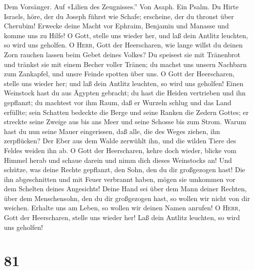  Dem Vorsänger. Auf «Lilien des Zeugnisses.'' Von Asaph.
Ein Psalm. Du Hirte Israels, höre, der du Joseph führst wie Schafe;
erscheine, der du thronst über Cherubim!  Erwecke deine
Macht vor Ephraim, Benjamin und Manasse und komme uns zu Hilfe!
 O Gott, stelle uns wieder her, und laß dein Antlitz
leuchten, so wird uns geholfen.  O \textsc{Herr}, Gott der
Heerscharen, wie lange willst du deinen Zorn rauchen lassen beim Gebet
deines Volkes?  Du speisest sie mit Tränenbrot und tränkst
sie mit einem Becher voller Tränen;  du machst uns unsern
Nachbarn zum Zankapfel, und unsre Feinde spotten über uns.
 O Gott der Heerscharen, stelle uns wieder her; und laß
dein Antlitz leuchten, so wird uns geholfen!  Einen
Weinstock hast du aus Ägypten gebracht; du hast die Heiden vertrieben
und ihn gepflanzt;  du machtest vor ihm Raum, daß er
Wurzeln schlug und das Land erfüllte;  sein Schatten
bedeckte die Berge und seine Ranken die Zedern Gottes; 
er streckte seine Zweige aus bis ans Meer und seine Schosse bis zum
Strom.  Warum hast du nun seine Mauer eingerissen, daß
alle, die des Weges ziehen, ihn zerpflücken?  Der Eber
aus dem Walde zerwühlt ihn, und die wilden Tiere des Feldes weiden ihn
ab.  O Gott der Heerscharen, kehre doch wieder, blicke
vom Himmel herab und schaue darein und nimm dich dieses Weinstocks an!
 Und schütze, was deine Rechte gepflanzt, den Sohn, den
du dir großgezogen hast!  Die ihn abgeschnitten und mit
Feuer verbrannt haben, mögen sie umkommen vor dem Schelten deines
Angesichts!  Deine Hand sei über dem Mann deiner Rechten,
über dem Menschensohn, den du dir großgezogen hast,  so
wollen wir nicht von dir weichen. Erhalte uns am Leben, so wollen wir
deinen Namen anrufen!  O \textsc{Herr}, Gott der
Heerscharen, stelle uns wieder her! Laß dein Antlitz leuchten, so wird
uns geholfen!

\hypertarget{section-80}{%
\section{81}\label{section-80}}

